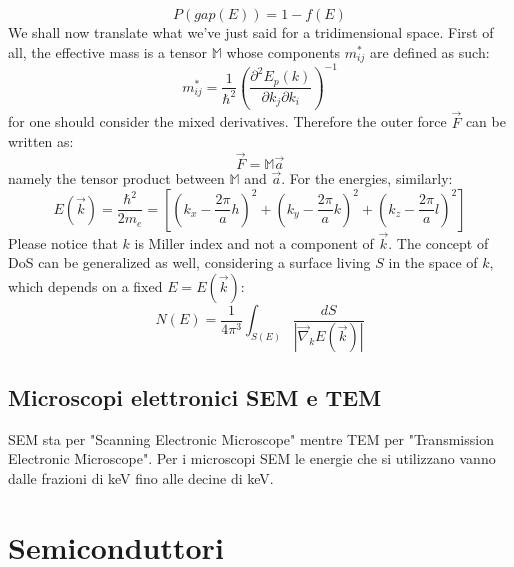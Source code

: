 \documentclass{book}
\begin{document}
                        $$P(gap(E)) = 1- f(E)$$
                        We shall now translate what we've just said for a tridimensional space. First of all, the effective mass is a tensor $\mathbb{M}$ whose components $m_{ij} ^{*}$ are defined as such:
                        $$m_{ij} ^{*} = \frac{1}{\hbar ^{2}} (\frac{\partial^{2}E_{p}(k)}{\partial k_{j}\partial k_{i}}) ^{-1}$$
                        for one should consider the mixed derivatives. Therefore the outer force $\vec{F}$ can be written as:
                        $$\vec{F} = \mathbb{M} \vec{a}$$
                        namely the tensor product between $\mathbb{M}$ and $\vec{a}$.
                        For the energies, similarly:
                        $$E(\vec{k}) = \frac{\hbar ^{2}}{2m_{e}} = [(k_{x} - \frac{2 \pi}{a}h)^{2}+(k_{y} - \frac{2 \pi}{a}k)^{2}+(k_{z} - \frac{2 \pi}{a}l)^{2}]$$
                        Please notice that $k$ is Miller index and not a component of $\vec{k}$.
                        The concept of DoS can be generalized as well, considering a surface living $S$ in the space of $k$, which depends on a fixed $E =E(\vec{k})$:
                        $$N(E) = \frac{1}{4 \pi^{3}} \int_{S(E)} \frac{dS}{|\vec{\nabla}_{k}E(\vec{k})|}$$
                       

            \section{Microscopi elettronici SEM e TEM}
                SEM sta per "Scanning Electronic Microscope" mentre TEM per "Transmission Electronic Microscope". Per i microscopi SEM le energie che si utilizzano vanno dalle frazioni di keV fino alle decine di keV.
\chapter{Semiconduttori}
\end{document}
